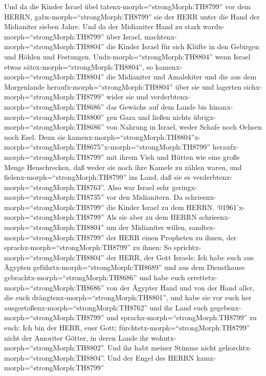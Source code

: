  Und da die Kinder Israel übel
tatenx-morph=``strongMorph:TH8799'' vor dem HERRN,
gabx-morph=``strongMorph:TH8799'' sie der HERR unter die Hand der
Midianiter sieben Jahre.  Und da der Midianiter Hand zu
stark wardx-morph=``strongMorph:TH8799'' über Israel,
machtenx-morph=``strongMorph:TH8804'' die Kinder Israel für sich Klüfte
in den Gebirgen und Höhlen und Festungen. 
Undx-morph=``strongMorph:TH8804'' wenn Israel etwas
sätex-morph=``strongMorph:TH8804'', so
kamenx-morph=``strongMorph:TH8804'' die Midianiter und Amalekiter und
die aus dem Morgenlande heraufx-morph=``strongMorph:TH8804'' über sie
 und lagerten sichx-morph=``strongMorph:TH8799'' wider sie
und verderbtenx-morph=``strongMorph:TH8686'' das Gewächs auf dem Lande
bis hinanx-morph=``strongMorph:TH8800'' gen Gaza und ließen nichts
übrigx-morph=``strongMorph:TH8686'' von Nahrung in Israel, weder Schafe
noch Ochsen noch Esel.  Denn sie
kamenx-morph=``strongMorph:TH8804''\textbar x-morph=``strongMorph:TH8675''x-morph=``strongMorph:TH8799''
heraufx-morph=``strongMorph:TH8799'' mit ihrem Vieh und Hütten wie eine
große Menge Heuschrecken, daß weder sie noch ihre Kamele zu zählen
waren, und fielenx-morph=``strongMorph:TH8799'' ins Land, daß sie es
verderbtenx-morph=``strongMorph:TH8763''.  Also war Israel
sehr geringx-morph=``strongMorph:TH8735'' vor den Midianitern. Da
schrieenx-morph=``strongMorph:TH8799'' die Kinder Israel zu dem HERRN.
 `01961'\textbar x-morph=``strongMorph:TH8799'' Als sie aber
zu dem HERRN schrieenx-morph=``strongMorph:TH8804'' um der Midianiter
willen,  sandtex-morph=``strongMorph:TH8799'' der HERR einen
Propheten zu ihnen, der sprachx-morph=``strongMorph:TH8799'' zu ihnen:
So sprichtx-morph=``strongMorph:TH8804'' der HERR, der Gott Israels: Ich
habe euch aus Ägypten geführtx-morph=``strongMorph:TH8689'' und aus dem
Diensthause gebrachtx-morph=``strongMorph:TH8686''  und habe
euch errettetx-morph=``strongMorph:TH8686'' von der Ägypter Hand und von
der Hand aller, die euch drängtenx-morph=``strongMorph:TH8801'', und
habe sie vor euch her ausgestoßenx-morph=``strongMorph:TH8762'' und ihr
Land euch gegebenx-morph=``strongMorph:TH8799''  und
sprachx-morph=``strongMorph:TH8799'' zu euch: Ich bin der HERR, euer
Gott; fürchtetx-morph=``strongMorph:TH8799'' nicht der Amoriter Götter,
in deren Lande ihr wohntx-morph=``strongMorph:TH8802''. Und ihr habt
meiner Stimme nicht gehorchtx-morph=``strongMorph:TH8804''.
 Und der Engel des HERRN kamx-morph=``strongMorph:TH8799''
